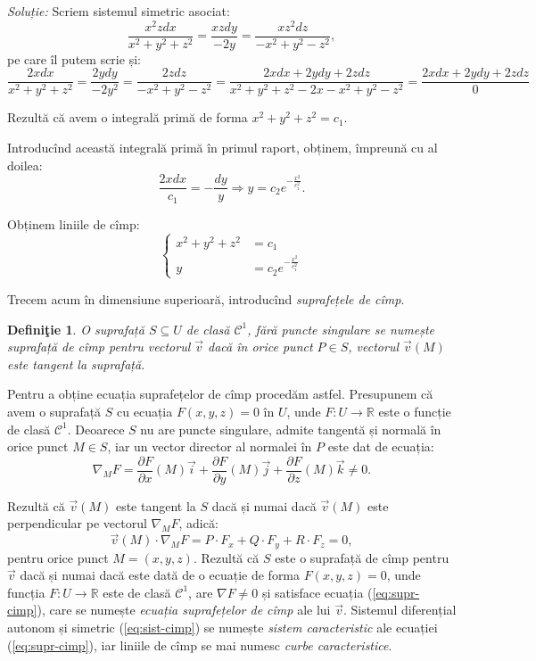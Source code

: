 \documentclass[11pt,a4paper]{article}
\newcommand\kal{\mathcal}
\newcommand\seq{\subseteq}
\newcommand\RR{\mathbb{R}}
\theoremstyle{dotless}
\theoremstyle{dotlessdr}
\newtheorem{definition}{Defini\c{t}ie}[section]
\begin{document}
\emph{Soluție:} Scriem sistemul simetric asociat:
\[
  \frac{x^2 z dx}{x^2 + y^2 + z^2} = \frac{xzdy}{-2y} = \frac{xz^2 dz}{-x^2 + y^2 - z^2},
\]
pe care îl putem scrie și:
\[
  \frac{2xdx}{x^2 + y^2 + z^2} = \frac{2ydy}{-2y^2} = \frac{2zdz}{-x^2 + y^2 - z^2} = %
  \frac{2xdx + 2ydy + 2zdz}{x^2 + y^2 + z^2 - 2x - x^2 + y^2 - z^2} = %
  \frac{2xdx + 2ydy + 2zdz}{0}
\]

Rezultă că avem o integrală primă de forma $ x^2 + y^2 + z^2 = c_1 $.

Introducînd această integrală primă în primul raport, obținem, împreună cu al doilea:
\[
  \frac{2xdx}{c_1} = -\frac{dy}{y} \Rightarrow y = c_2 e^{-\frac{x^2}{c_1^2}}.
\]

Obținem liniile de cîmp:
\[
  \begin{cases}
    x^2 + y^2 + z^2 &= c_1 \\
    y &= c_2 e^{-\frac{x^2}{c_1^2}}
  \end{cases}
\]

\vspace{1cm}

Trecem acum în dimensiune superioară, introducînd \emph{suprafețele de cîmp}.

\begin{definition}\label{def:supr-cimp}
  O suprafață $ S \seq U $ de clasă $ \kal{C}^1 $, fără puncte singulare se numește
  \emph{suprafață de cîmp} pentru vectorul $ \vec{v} $ dacă în orice punct $ P \in S $,
  vectorul $ \vec{v}(M) $ este tangent la suprafață.
\end{definition}

Pentru a obține ecuația suprafețelor de cîmp procedăm astfel. Presupunem că avem o suprafață $ S $
cu ecuația $ F(x, y, z) = 0 $ în $U$, unde $ F : U \to \RR $ este o funcție de clasă $ \kal{C}^1 $.
Deoarece $ S $ nu are puncte singulare, admite tangentă și normală în orice punct $ M \in S $, iar
un vector director al normalei în $ P $ este dat de ecuația:
\[
  \nabla_M F = \frac{\partial F}{\partial x}(M) \vec{i} + \frac{\partial F}{\partial y}(M)\vec{j} + %
  \frac{\partial F}{\partial z}(M) \vec{k} \neq 0.
\]

Rezultă că $ \vec{v}(M) $ este tangent la $ S $ dacă și numai dacă $ \vec{v}(M) $ este perpendicular
pe vectorul $ \nabla_M F $, adică:
\begin{equation} \label{eq:supr-cimp}
  \vec{v}(M) \cdot \nabla_M F = P \cdot F_x + Q \cdot F_y + R \cdot F_z = 0,
\end{equation}
pentru orice punct $ M = (x, y, z) $. Rezultă că $ S $ este o suprafață de cîmp pentru $ \vec{v} $
dacă și numai dacă este dată de o ecuație de forma $ F(x, y, z) = 0 $, unde funcția $ F : U \to \RR $
este de clasă $ \kal{C}^1 $, are $ \nabla F \neq 0 $ și satisface ecuația (\ref{eq:supr-cimp}),
care se numește \emph{ecuația suprafețelor de cîmp} ale lui $ \vec{v} $. Sistemul diferențial autonom
și simetric (\ref{eq:sist-cimp}) se numește \emph{sistem caracteristic} ale ecuației
(\ref{eq:supr-cimp}), iar liniile de cîmp se mai numesc \emph{curbe caracteristice}.
\end{document}
